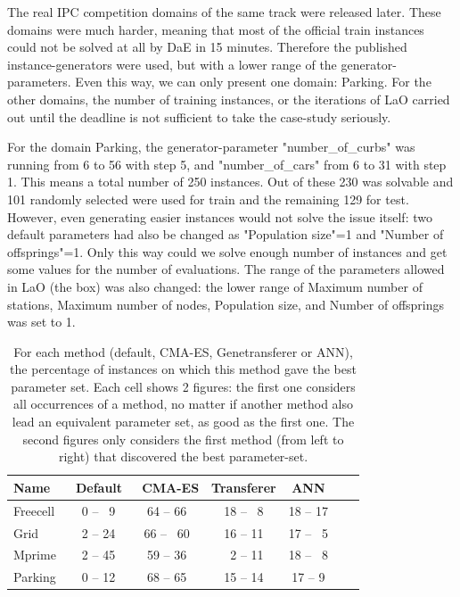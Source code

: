 \documentclass[runningheads,a4paper]{llncs}
\begin{document}
The real IPC competition domains of the same track were released later. These domains were much harder, meaning that most of the official train instances could not be solved at all by DaE in 15 minutes. Therefore the published instance-generators were used, but with a lower range of the generator-parameters. Even this way, we can only present one domain: Parking. For the other domains, the number of training instances, or the iterations of LaO carried out until the deadline is not sufficient to take the case-study seriously.

For the domain Parking, the generator-parameter "number\_of\_curbs" was running from 6 to 56 with step 5, and "number\_of\_cars" from 6 to 31 with step 1. This means a total number of 250 instances. Out of these 230 was solvable and 101 randomly selected were used for train and the remaining 129 for test. However, even generating easier instances would not solve the issue itself: two default parameters had also be changed as "Population size"=1 and "Number of offsprings"=1. Only this way could we solve enough number of instances and get some values for the number of evaluations. The range of the parameters allowed in LaO (the box) was also changed: the lower range of Maximum number of stations, Maximum number of nodes, Population size, and Number of offsprings was set to 1.


 \begin{table}[tb!]
\centering
\begin{tabular}{l c c c c c c}
\hline\hline
Name & \ Default & \ CMA-ES &  Transferer & ANN \\ 
\hline
Freecell & ~0 -- ~9& 64 -- 66  & 18 -- ~8  & 18 -- 17     \\
Grid & ~2 -- 24 & 66 -- ~60  & 16 -- 11 & 17 -- ~5  &    \\
Mprime &  ~2 -- 45& 59 -- 36 & ~2 -- 11  & 18 -- ~8  &    \\
Parking &  ~0 -- 12 & 68 -- 65  &  15 -- 14   & 17 -- 9   &    \\


\hline
\end{tabular}
\caption{For each method (default, CMA-ES, Genetransferer or ANN), the percentage of instances on which this method gave the best parameter set. Each cell shows 2 figures: the first one considers all occurrences of a method, no matter if another method also lead an equivalent parameter set, as good as the first one. The second figures only considers the first method (from left to right) that discovered the best parameter-set.}
\label{table:hints}
\end{table} 
\end{document}
